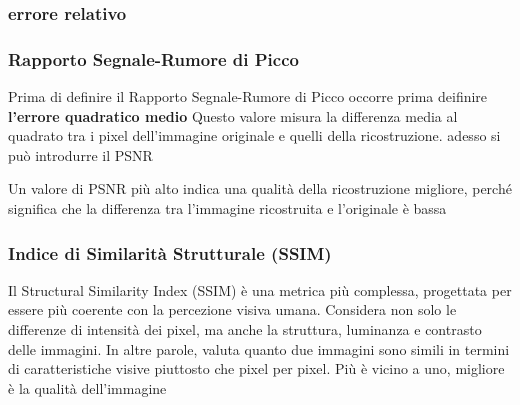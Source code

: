 \subsubsection{errore relativo}
\subsubsection{Rapporto Segnale-Rumore di Picco}
Prima di definire il Rapporto Segnale-Rumore di Picco occorre prima deifinire \textbf{l'errore quadratico medio} 
Questo valore misura la differenza media al quadrato tra i pixel dell’immagine originale e quelli della ricostruzione. adesso si può introdurre il PSNR

Un valore di PSNR più alto indica una qualità della ricostruzione migliore, perché significa che la differenza tra l'immagine ricostruita e l'originale è bassa

\subsubsection{Indice di Similarità Strutturale (SSIM)}
Il Structural Similarity Index (SSIM) è una metrica più complessa, progettata per essere più coerente con la percezione visiva umana. Considera non solo le differenze di intensità dei pixel, ma anche la struttura, luminanza e contrasto delle immagini. In altre parole, valuta quanto due immagini sono simili in termini di caratteristiche visive piuttosto che pixel per pixel. Più è vicino a uno, migliore è la qualità dell’immagine

